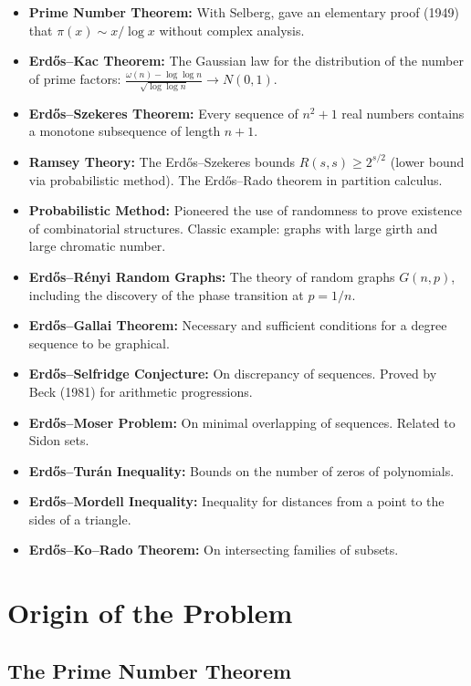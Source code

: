 \begin{itemize}
    \item \textbf{Prime Number Theorem:} With Selberg, gave an elementary proof (1949) that $\pi(x) \sim x/\log x$ without complex analysis.
    \item \textbf{Erd\H{o}s--Kac Theorem:} The Gaussian law for the distribution of the number of prime factors: $\frac{\omega(n) - \log\log n}{\sqrt{\log\log n}} \to N(0,1)$.
    \item \textbf{Erd\H{o}s--Szekeres Theorem:} Every sequence of $n^2+1$ real numbers contains a monotone subsequence of length $n+1$.
    \item \textbf{Ramsey Theory:} The Erd\H{o}s--Szekeres bounds $R(s,s) \geq 2^{s/2}$ (lower bound via probabilistic method). The Erd\H{o}s--Rado theorem in partition calculus.
    \item \textbf{Probabilistic Method:} Pioneered the use of randomness to prove existence of combinatorial structures. Classic example: graphs with large girth and large chromatic number.
    \item \textbf{Erd\H{o}s--R\'{e}nyi Random Graphs:} The theory of random graphs $G(n,p)$, including the discovery of the phase transition at $p = 1/n$.
    \item \textbf{Erd\H{o}s--Gallai Theorem:} Necessary and sufficient conditions for a degree sequence to be graphical.
    \item \textbf{Erd\H{o}s--Selfridge Conjecture:} On discrepancy of sequences. Proved by Beck (1981) for arithmetic progressions.
    \item \textbf{Erd\H{o}s--Moser Problem:} On minimal overlapping of sequences. Related to Sidon sets.
    \item \textbf{Erd\H{o}s--Tur\'{a}n Inequality:} Bounds on the number of zeros of polynomials.
    \item \textbf{Erd\H{o}s--Mordell Inequality:} Inequality for distances from a point to the sides of a triangle.
    \item \textbf{Erd\H{o}s--Ko--Rado Theorem:} On intersecting families of subsets.
\end{itemize}

\section{Origin of the Problem}

\subsection{The Prime Number Theorem}

